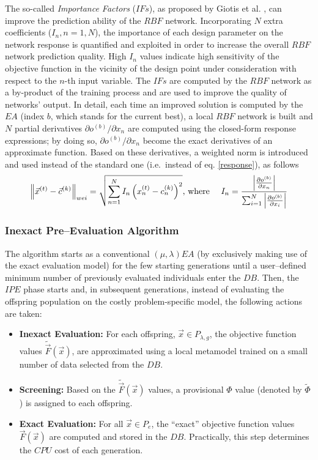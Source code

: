 The so-called \textit{Importance Factors} ($IFs$), as proposed by Giotis et al. \cite{LTT_2_018}, can improve the prediction ability of the $RBF$ network. Incorporating $N$ extra coefficients ($I_n, n\!=\!1,N$), the importance of each design parameter on the network response is quantified and exploited in order to increase the overall $RBF$ network prediction quality. High $I_n$ values indicate high sensitivity of the objective function in the vicinity of the design point under consideration with respect to the $n$-th input variable. The $IFs$ are computed by the $RBF$ network as a by-product of the training process and are used to improve the quality of networks' output. 
In detail, each time an improved solution is computed by the $EA$ (index $b$, which stands for the current best), a local $RBF$ network is built and $N$ partial derivatives $\partial o^{(b)} / \partial x_{n}$ are computed using the closed-form response expressions; by doing so, $\partial o^{(b)} / \partial x_{n}$ become the exact derivatives of an approximate function. 
Based on these derivatives, a weighted norm is introduced and used instead of the standard one (i.e.\ instead of eq. \ref{response}), as follows
%
\begin{equation}\label{e:IFcomp}
    \left\|\vec x^{(t)}-\vec c^{(k)}\right\|_{wei} =
    \sqrt{  \sum_{n=1}^N I_n\left(x_n^{(t)}-c_n^{(k)}\right)^2  }
	\mbox{,~where~~~~}
    I_n = { {\left|  {\partial o^{(b)}} \over {\partial x_n} \right|} 
          \over 
  { \sum_{i=1}^{N} \left| {\partial o^{(b)}} \over {\partial x_i} \right| } }
\end{equation}


\subsubsection{Inexact Pre--Evaluation Algorithm}


The algorithm starts as a conventional $(\mu, \lambda)EA$ (by exclusively making use of the exact evaluation model) for the few starting generations until a user--defined minimum number of previously evaluated individuals enter the $DB$. 
Then, the $IPE$ phase starts and, in subsequent generations, instead of evaluating the offspring population on the costly problem-specific model, the following actions are taken:
\newcommand{\apprx}[1]{\tilde{#1}}
\begin{itemize}
\item[]{\bf Inexact Evaluation:}
For each offspring, $\vec{x}\!\in\!P_{\lambda,g}$, the objective function values $\apprx{\vec{F}}(\vec{x})$, are approximated using a local metamodel trained on a small number of data selected from the $DB$. 
%
\item[]{\bf Screening:}
Based on the $\apprx{\vec{F}}(\vec{x})$ values, a provisional
$\Phi$ value (denoted by $\apprx{\Phi}$) is assigned to each
offspring.
\item[]{\bf Exact Evaluation:}
For all $\vec{x}\!\in\!P_{e}$, the ``exact'' objective function values $\vec{F}(\vec{x})$ are computed and stored in the $DB$. 
Practically, this step determines the $CPU$ cost of each generation.
\end{itemize}



